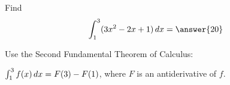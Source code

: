 \documentclass{ximera}
\author{Gregory Hartman \and Matthew Carr}
\begin{document}
\begin{exercise}

Find
\[
\int_{1}^{3}(3x^2-2x+1)\d x=\answer{20}
\]
\begin{hint}
Use the Second Fundamental Theorem of Calculus: 

$\int_{1}^{3}f(x)\mathop{}\!d x=F(3)-F(1)$, where $F$ is an antiderivative of $f$.
\end{hint}
\end{exercise}
\end{document}
